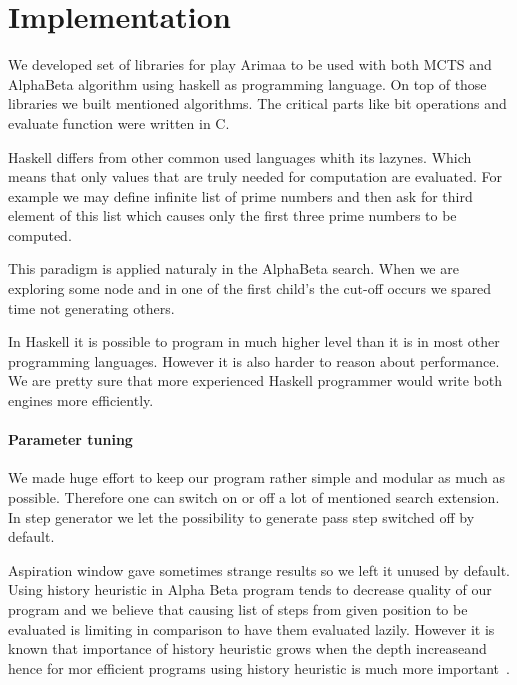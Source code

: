 \chapter{Implementation}
We developed set of libraries for play Arimaa to be used with both MCTS and
AlphaBeta algorithm using haskell as programming language. On top of those
libraries we built mentioned algorithms. The critical parts like bit operations
and evaluate function were written in C.

Haskell differs from other common used languages whith its lazynes. Which means
that only values that are truly needed for computation are evaluated. For
example we may define infinite list of prime numbers and then ask for third
element of this list which causes only the first three prime numbers to be
computed.

This paradigm is applied naturaly in the AlphaBeta search. When we are
exploring some node and in one of the first child's the cut-off occurs we
spared time not generating others.


In Haskell it is possible to program in much higher level than it is in most
other programming languages. However it is also harder to reason about
performance. We are pretty sure that more experienced Haskell programmer would
write both engines more efficiently.

\subsubsection{Parameter tuning}

We made huge effort to keep our program rather simple and modular as much as
possible. Therefore one can switch on or off a lot of mentioned search
extension. In step generator we let the possibility to generate pass step
switched off by default.

Aspiration window gave sometimes strange results so we left it unused by default.
Using history heuristic in Alpha Beta program tends to decrease quality of our
program and we believe that causing list of steps from given position to be
evaluated is limiting in comparison to have them evaluated lazily. However it
is known that importance of history heuristic grows when the depth increaseand
hence for mor efficient programs using history heuristic is much more
important~\cite{ZHONG}.

